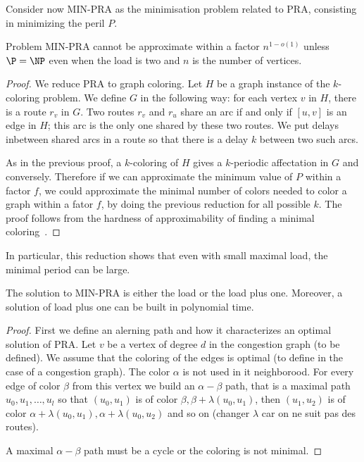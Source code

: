 \documentclass{article}
\begin{document}


Consider now MIN-PRA as the minimisation problem related to PRA, consisting in minimizing the peril $P$.

\begin{theorem}
 Problem MIN-PRA cannot be approximate within a factor $n^{1-o(1)}$ unless $\P = \NP$ even when the load is two
 and $n$ is the number of vertices.
\end{theorem}

\begin{proof}
 We reduce PRA to graph coloring. Let $H$ be a graph instance of the $k$-coloring problem. 
 We define $G$ in the following way: for each vertex $v$ in $H$, there is a route $r_v$ in $G$.
 Two routes $r_v$ and $r_u$ share an arc if and only if $[u,v]$ is an edge in $H$; this arc is the only one shared by these two routes.   We put delays inbetween shared arcs in a route so that there is a delay $k$ between two such arcs. 
 
 As in the previous proof, a $k$-coloring of $H$ gives a $k$-periodic affectation in $G$
 and conversely. Therefore if we can approximate the minimum value of $P$  within a factor $f$,
 we could approximate the minimal number of colors needed to color a graph within a fator $f$, 
 by doing the previous reduction for all possible $k$. The proof follows from the hardness of approximability
 of finding a minimal coloring~\cite{zuckerman2006linear}.
\end{proof}


In particular, this reduction shows that even with small maximal load, the 
minimal period can be large.

 \begin{proposition}
The solution to MIN-PRA is either the load or the load plus one.
Moreover, a solution of  load plus one can be built in polynomial time.
\end{proposition}

\begin{proof}
 First we define an alerning path and how it characterizes an optimal solution of PRA.
 Let $v$ be a vertex of degree $d$ in the congestion graph (to be defined). We assume that the 
 coloring of the edges is optimal (to define in the case of a congestion graph). 
 The color $\alpha$ is not used in it neighborood. For every edge of color $\beta$ from this vertex
 we build an $\alpha - \beta$ path, that is a maximal path $u_0,u_1,\dots, u_l$ so that 
 $(u_0,u_1)$ is of color $\beta,\beta + \lambda(u_0,u_1)$, then $(u_1,u_2)$ is of color $\alpha + \lambda(u_0,u_1),\alpha +\lambda(u_0,u_2)$
 and so on (changer $\lambda$ car on ne suit pas des routes).
 
 A maximal $\alpha - \beta$ path must be a cycle or the coloring is not minimal.
\end{proof}
\end{document}
